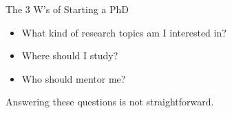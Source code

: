 \begin{frame}[fragile]{The 3 W's of Starting a PhD}

\begin{itemize}
    \item \textcolor{red!60}{What} kind of research topics am I interested in?
    \item \textcolor{green!60!black}{Where} should I study?
    \item \textcolor{blue!60}{Who} should mentor me?
\end{itemize}

Answering these questions is not straightforward.

\end{frame}

